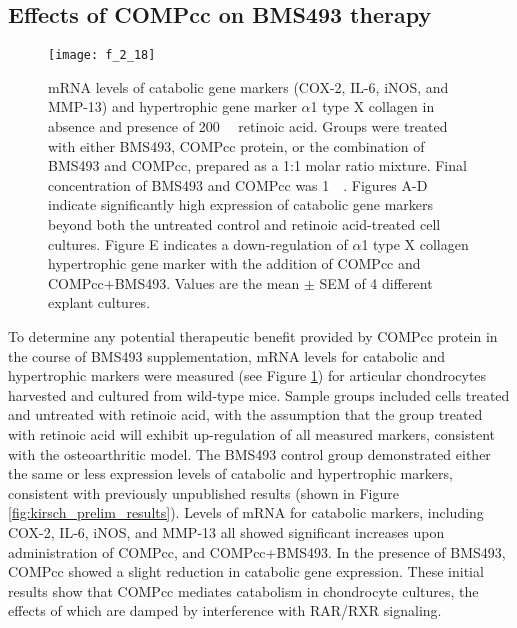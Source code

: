 \begin{refsection}
\subsection{Effects of COMPcc on BMS493 therapy}
\label{sec:bms493_results}
\begin{figure}[h!] \centering \texttt{[image: f\_2\_18]}
    \caption{mRNA levels of catabolic gene markers (COX-2, IL-6, iNOS, and
        MMP-13) and hypertrophic gene marker ${\alpha}$1 type X collagen in
        absence and presence of \SI{200}{\nano\moLar} retinoic acid. Groups were
        treated with either BMS493, COMPcc protein, or the
        combination of BMS493 and COMPcc, prepared as a 1:1 molar ratio mixture.
        Final concentration of BMS493 and COMPcc was \SI{1}{\micro\moLar}. Figures
        A-D indicate significantly high expression of catabolic gene markers
        beyond both the untreated control and retinoic acid-treated cell
        cultures. Figure E indicates a down-regulation of ${\alpha}$1 type X
        collagen hypertrophic gene marker with the addition of COMPcc and
        COMPcc+BMS493. Values are the mean ${\pm}$ SEM of 4 different explant
    cultures.}
    \label{fig:pcr_panel} \end{figure}
To determine any potential therapeutic benefit provided by COMPcc protein in the
course of BMS493 supplementation, mRNA levels for catabolic and hypertrophic
markers were measured (see Figure \ref{fig:pcr_panel}) for articular
chondrocytes harvested and cultured from wild-type mice. Sample groups included
cells treated and untreated with retinoic acid, with the assumption that the
group treated with retinoic acid will exhibit up-regulation of all measured
markers, consistent with the  osteoarthritic
model.\cite{Davies2009,Cohen2006a} The BMS493 control group demonstrated either
the same or less expression levels of catabolic and hypertrophic markers,
consistent with previously unpublished results (shown in Figure
\ref{fig:kirsch_prelim_results}).
Levels of mRNA for catabolic markers, including COX-2, IL-6, iNOS, and MMP-13
all showed significant increases upon administration of COMPcc, and COMPcc+BMS493.
In the presence of BMS493, COMPcc showed a slight reduction in catabolic gene
expression. These initial results show that COMPcc mediates catabolism in
chondrocyte cultures, the effects of which are damped by interference with
RAR/RXR signaling.


\end{refsection}
